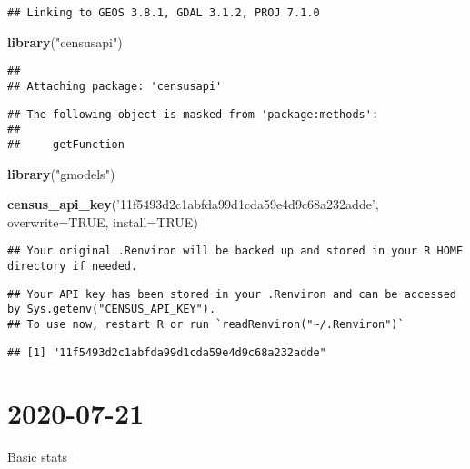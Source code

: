 \documentclass[]{article}
\newenvironment{Shaded}{\begin{snugshade}}{\end{snugshade}}
\newcommand{\DataTypeTok}[1]{\textcolor[rgb]{0.13,0.29,0.53}{#1}}
\newcommand{\KeywordTok}[1]{\textcolor[rgb]{0.13,0.29,0.53}{\textbf{#1}}}
\newcommand{\NormalTok}[1]{#1}
\newcommand{\OtherTok}[1]{\textcolor[rgb]{0.56,0.35,0.01}{#1}}
\newcommand{\StringTok}[1]{\textcolor[rgb]{0.31,0.60,0.02}{#1}}
\begin{document}
\begin{verbatim}
## Linking to GEOS 3.8.1, GDAL 3.1.2, PROJ 7.1.0
\end{verbatim}

\begin{Shaded}
\begin{Highlighting}[]
\KeywordTok{library}\NormalTok{(}\StringTok{"censusapi"}\NormalTok{)}
\end{Highlighting}
\end{Shaded}

\begin{verbatim}
## 
## Attaching package: 'censusapi'
\end{verbatim}

\begin{verbatim}
## The following object is masked from 'package:methods':
## 
##     getFunction
\end{verbatim}

\begin{Shaded}
\begin{Highlighting}[]
\KeywordTok{library}\NormalTok{(}\StringTok{"gmodels"}\NormalTok{)}

\KeywordTok{census_api_key}\NormalTok{(}\StringTok{'11f5493d2c1abfda99d1cda59e4d9c68a232adde'}\NormalTok{, }\DataTypeTok{overwrite=}\OtherTok{TRUE}\NormalTok{, }\DataTypeTok{install=}\OtherTok{TRUE}\NormalTok{)}
\end{Highlighting}
\end{Shaded}

\begin{verbatim}
## Your original .Renviron will be backed up and stored in your R HOME directory if needed.
\end{verbatim}

\begin{verbatim}
## Your API key has been stored in your .Renviron and can be accessed by Sys.getenv("CENSUS_API_KEY"). 
## To use now, restart R or run `readRenviron("~/.Renviron")`
\end{verbatim}

\begin{verbatim}
## [1] "11f5493d2c1abfda99d1cda59e4d9c68a232adde"
\end{verbatim}

\hypertarget{section}{%
\section{2020-07-21}\label{section}}

Basic stats
\end{document}
